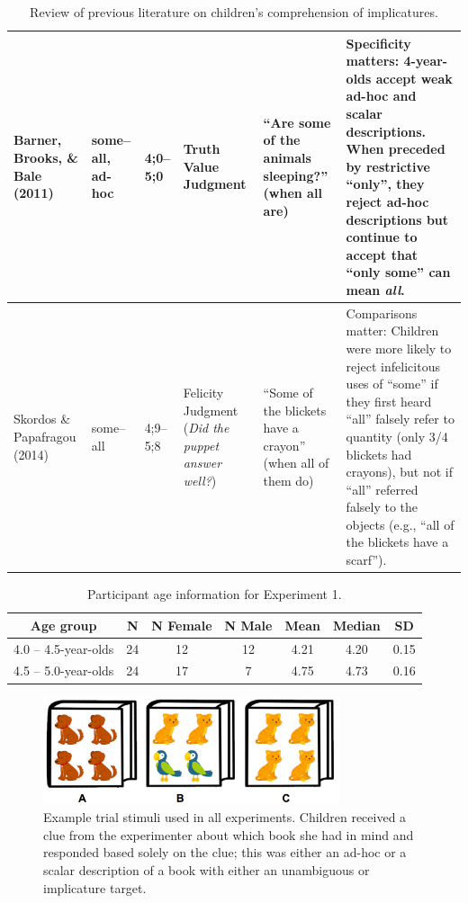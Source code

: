 \documentclass[man]{apa2}
\begin{document}
\begin{landscape}
\begin{table}[!ht]
\begin{tabular}{| p{2.2cm} | p{2cm} | p{1.69cm} | p{4.5cm} | p{5cm} | p{7.2cm} |}
Barner, Brooks, \& Bale (2011) & some--all, ad-hoc & 4;0--5;0 &Truth Value Judgment & ``Are some of the animals sleeping?'' (when all are) & Specificity matters: 4-year-olds accept weak ad-hoc and scalar descriptions. When preceded by restrictive ``only'', they reject ad-hoc descriptions but continue to accept that ``only some'' can mean \emph{all}.\\ \hline
\parbox[t]{2.2cm}{Skordos \&\\Papafragou (2014)} & some--all & 4;9--5;8 & Felicity Judgment (\textit{Did the puppet answer well?}) & ``Some of the blickets have a crayon'' (when all of them do)  & Comparisons matter: Children were more likely to reject infelicitous uses of ``some'' if they first heard ``all'' falsely refer to quantity (only 3/4 blickets had crayons), but not if ``all'' referred falsely to the objects (e.g., ``all of the blickets have a scarf'').\\ \hline \end{tabular}
\caption{\label{tab:lit_review}Review of previous literature on children's comprehension of implicatures.}
\end{table}
\end{landscape}
\restoregeometry

\newpage

\begin{table}[tb]
\centering
\begin{tabular}{ccccccc}
\hline
{\bf Age group} & {\bf N} & {\bf N Female} & {\bf N Male} & {\bf Mean} & {\bf Median} & {\bf SD} \\
\hline
4.0 -- 4.5-year-olds & 24 & 12 & 12 & 4.21 & 4.20 & 0.15 \\
4.5 -- 5.0-year-olds & 24 & 17 & 7 & 4.75 & 4.73 & 0.16\\
\hline
\end{tabular}
\caption{\label{tab:exp_1_demo}Participant age information for Experiment 1.}
\end{table}

\begin{figure}
 \begin{center}
  \includegraphics[height=1.25in]{figures/implicatures_demo_letters.png}
  \caption{\label{fig:demo} Example trial stimuli used in all experiments. Children received a clue from the experimenter about which book she had in mind and responded based solely on the clue; this was either an ad-hoc or a scalar description of a book with either an unambiguous or implicature target.}
 \end{center}
\end{figure}
\end{document}
